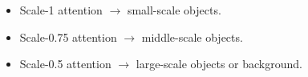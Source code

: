 \documentclass[landscape,final,a0paper,fontscale=0.285]{baposter}
\begin{document}
\begin{poster}
{    \begin{itemize}
      \setlength{\itemsep}{-5pt}
    \item {Scale-1 attention $\rightarrow$ small-scale objects.}
    \item {Scale-0.75 attention $\rightarrow$ middle-scale objects.}
    \item {Scale-0.5 attention $\rightarrow$ large-scale objects or background.}
    \end{itemize}
}




\end{poster}
\end{document}
